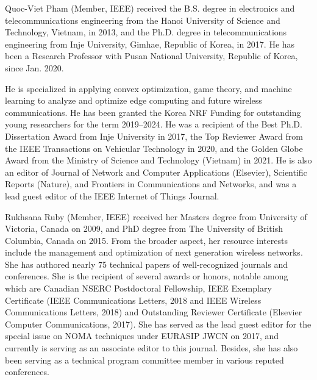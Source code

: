 \documentclass[journal]{IEEEtran}
\begin{document}
\begin{IEEEbiography}
{Quoc-Viet Pham} (Member, IEEE) received the B.S. degree in electronics and telecommunications engineering from the Hanoi University of Science and Technology, Vietnam, in 2013, and the Ph.D. degree in telecommunications engineering from Inje University, Gimhae, Republic of Korea, in 2017. He has been a Research Professor with Pusan National University, Republic of Korea, since Jan. 2020.

He is specialized in applying convex optimization, game theory, and machine learning to analyze and optimize edge computing and future wireless communications. He has been granted the Korea NRF Funding for outstanding young researchers for the term 2019–2024. He was a recipient of the Best Ph.D. Dissertation Award from Inje University in 2017, the Top Reviewer Award from the IEEE Transactions on Vehicular Technology in 2020, and the Golden Globe Award from the Ministry of Science and Technology (Vietnam) in 2021. He is also an editor of Journal of Network and Computer Applications (Elsevier), Scientific Reports (Nature), and Frontiers in Communications and Networks, and was a lead guest editor of the IEEE Internet of Things Journal.
\end{IEEEbiography}
\begin{IEEEbiography}
{Rukhsana Ruby} (Member, IEEE) received her Masters degree from University of Victoria, Canada on 2009, and PhD degree from The University of British
Columbia, Canada on 2015. From the broader aspect, her resource interests include the management and optimization of next generation wireless networks. She has authored nearly 75 technical papers of well-recognized journals and conferences. She is the recipient of several awards or honors, notable among which are Canadian NSERC Postdoctoral Fellowship, IEEE Exemplary Certificate (IEEE Communications Letters, 2018 and IEEE Wireless Communications Letters,
2018) and Outstanding Reviewer Certificate (Elsevier Computer Communications, 2017). She has served as the lead guest editor for the special issue on
NOMA techniques under EURASIP JWCN on 2017, and currently is serving as an associate editor to this journal. Besides, she has also been serving as a
technical program committee member in various reputed conferences.
\end{IEEEbiography}
\end{document}
